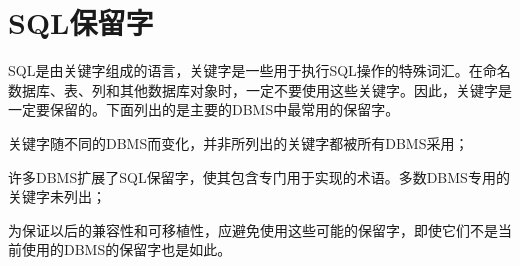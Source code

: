 \section{SQL保留字}

SQL是由关键字组成的语言，关键字是一些用于执行SQL操作的特殊词汇。在命名数据库、表、列和其他数据库对象时，一定不要使用这些关键字。因此，关键字是一定要保留的。下面列出的是主要的DBMS中最常用的保留字。

\begin{compactitem}
\item 关键字随不同的DBMS而变化，并非所列出的关键字都被所有DBMS采用；
\item 许多DBMS扩展了SQL保留字，使其包含专门用于实现的术语。多数DBMS专用的关键字未列出；
\item 为保证以后的兼容性和可移植性，应避免使用这些可能的保留字，即使它们不是当前使用的DBMS的保留字也是如此。
\end{compactitem}

